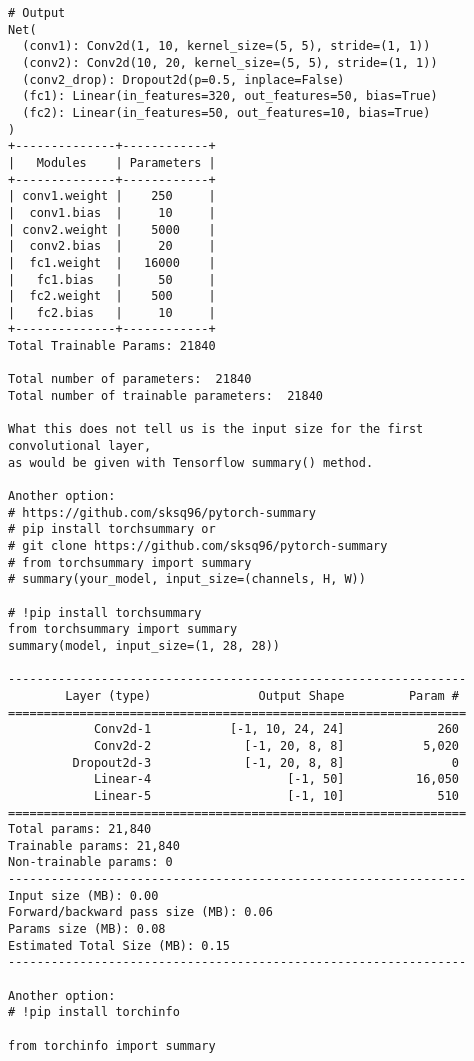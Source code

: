 \begin{verbatim}
# Output
Net(
  (conv1): Conv2d(1, 10, kernel_size=(5, 5), stride=(1, 1))
  (conv2): Conv2d(10, 20, kernel_size=(5, 5), stride=(1, 1))
  (conv2_drop): Dropout2d(p=0.5, inplace=False)
  (fc1): Linear(in_features=320, out_features=50, bias=True)
  (fc2): Linear(in_features=50, out_features=10, bias=True)
)
+--------------+------------+
|   Modules    | Parameters |
+--------------+------------+
| conv1.weight |    250     |
|  conv1.bias  |     10     |
| conv2.weight |    5000    |
|  conv2.bias  |     20     |
|  fc1.weight  |   16000    |
|   fc1.bias   |     50     |
|  fc2.weight  |    500     |
|   fc2.bias   |     10     |
+--------------+------------+
Total Trainable Params: 21840

Total number of parameters:  21840
Total number of trainable parameters:  21840

What this does not tell us is the input size for the first convolutional layer,
as would be given with Tensorflow summary() method.

Another option:
# https://github.com/sksq96/pytorch-summary
# pip install torchsummary or
# git clone https://github.com/sksq96/pytorch-summary
# from torchsummary import summary
# summary(your_model, input_size=(channels, H, W))

# !pip install torchsummary
from torchsummary import summary
summary(model, input_size=(1, 28, 28))

----------------------------------------------------------------
        Layer (type)               Output Shape         Param #
================================================================
            Conv2d-1           [-1, 10, 24, 24]             260
            Conv2d-2             [-1, 20, 8, 8]           5,020
         Dropout2d-3             [-1, 20, 8, 8]               0
            Linear-4                   [-1, 50]          16,050
            Linear-5                   [-1, 10]             510
================================================================
Total params: 21,840
Trainable params: 21,840
Non-trainable params: 0
----------------------------------------------------------------
Input size (MB): 0.00
Forward/backward pass size (MB): 0.06
Params size (MB): 0.08
Estimated Total Size (MB): 0.15
----------------------------------------------------------------

Another option:
# !pip install torchinfo

from torchinfo import summary


\end{verbatim}

